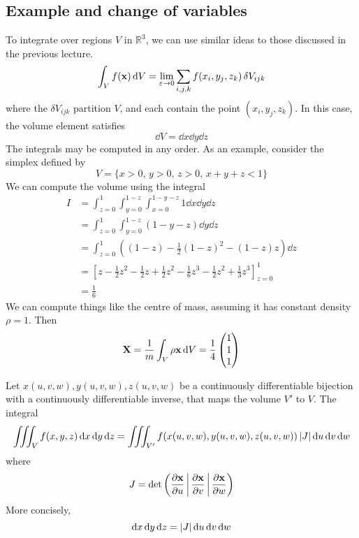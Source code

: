 \subsection{Example and change of variables}
To integrate over regions \(V\) in \(\mathbb R^3\), we can use similar ideas to those discussed in the previous lecture.
\[
	\int_V f(\vb x) \dd{V} = \lim_{\varepsilon \to 0} \sum_{i,j,k} f(x_i, y_j, z_k) \,\delta V_{ijk}
\]
where the \(\delta V_{ijk}\) partition \(V\), and each contain the point \((x_i, y_j, z_k)\).
In this case, the volume element satisfies
\[
	\dd{V} = \dd{x}\dd{y}\dd{z}
\]
The integrals may be computed in any order.
As an example, consider the simplex defined by
\[
	V = \{ x > 0,\, y > 0,\, z > 0,\, x+y+z < 1 \}
\]
We can compute the volume using the integral
\begin{align*}
	I & = \int_{z=0}^1 \int_{y=0}^{1-z} \int_{x=0}^{1-y-z} 1 \dd{x}\dd{y}\dd{z}                                                        \\
	  & = \int_{z=0}^1 \int_{y=0}^{1-z} (1-y-z)\dd{y}\dd{z}                                                                            \\
	  & = \int_{z=0}^1 \left((1-z) - \frac{1}{2}(1-z)^2 - (1-z)z\right) \dd{z}                                                         \\
	  & = \left[ z - \frac{1}{2}z^2 - \frac{1}{2}z + \frac{1}{2}z^2 - \frac{1}{6}z^3 - \frac{1}{2}z^2 + \frac{1}{3}z^3 \right]_{z=0}^1 \\
	  & = \frac{1}{6}
\end{align*}
We can compute things like the centre of mass, assuming it has constant density \(\rho = 1\).
Then
\[
	\vb X = \frac{1}{m} \int_V \rho \vb x \dd{V} = \frac{1}{4}\begin{pmatrix}
		1 \\1\\1
	\end{pmatrix}
\]
\begin{proposition}
	Let \(x(u, v, w), y(u, v, w), z(u, v, w)\) be a continuously differentiable bijection with a continuously differentiable inverse, that maps the volume \(V'\) to \(V\).
	The integral
	\[
		\iiint_V f(x, y, z)\dd{x}\dd{y}\dd{z} = \iiint_{V'} f(x(u, v, w), y(u, v, w), z(u, v, w))\,\abs{J}\dd{u}\dd{v}\dd{w}
	\]
	where
	\[
		J = \det\left( \frac{\partial \vb x}{\partial u} \,\middle|\, \frac{\partial \vb x}{\partial v} \,\middle|\, \frac{\partial \vb x}{\partial w} \right)
	\]
	More concisely,
	\[
		\dd{x}\dd{y}\dd{z} = \abs{J}\dd{u}\dd{v}\dd{w}
	\]
\end{proposition}
